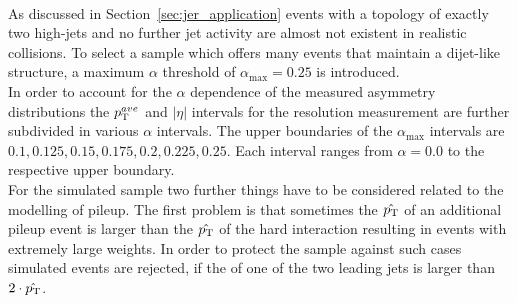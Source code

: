 \begin{table}[!tp]
\centering
\caption{Overview of the $|\eta|$ and $\pt^{ave}$ interval boundaries used for the resolution measurement.}
\label{tab:binning}
\end{table} 
\\
As discussed in Section~\ref{sec:jer_application} events with a topology of exactly two high-\pt jets and no further jet activity are almost not existent in realistic collisions. To select a sample which offers many events that maintain a dijet-like structure, a maximum $\alpha$ threshold of $\alpha_\mathrm{max} = 0.25$ is introduced. \\
In order to account for the $\alpha$ dependence of the measured asymmetry distributions the $\pt^{ave}$ and $|\eta|$ intervals for the resolution measurement are further subdivided in various $\alpha$ intervals. The upper boundaries of the $\alpha_\mathrm{max}$ intervals are $0.1, 0.125, 0.15, 0.175, 0.2, 0.225, 0.25$. Each interval ranges from $\alpha = 0.0$ to the respective upper boundary. \\
For the simulated sample two further things have to be considered related to the modelling of pileup. The first problem is that sometimes the $\hat{p_{\text{T}}}$ of an additional pileup event is larger than the $\hat{p_{\text{T}}}$ of the hard interaction resulting in events with extremely large weights. In order to protect the sample against such cases simulated events are rejected, if the \pt of one of the two leading jets is larger than $2 \cdot \hat{p_{\text{T}}}$.\\
